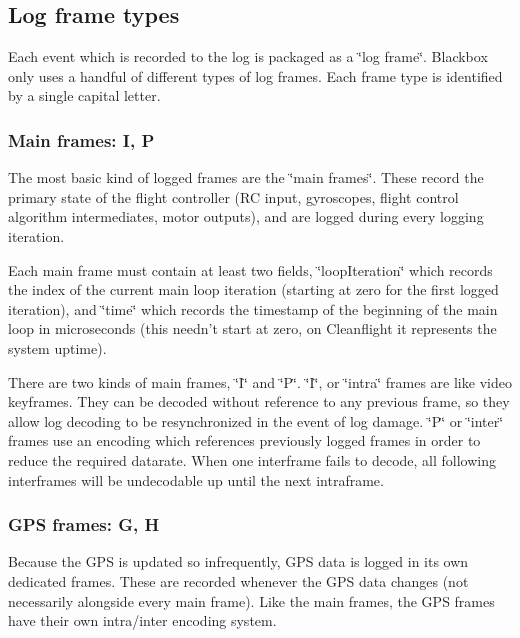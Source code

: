 \subsection*{Log frame types}

Each event which is recorded to the log is packaged as a \char`\"{}log frame\char`\"{}. Blackbox only uses a handful of different types of log frames. Each frame type is identified by a single capital letter.

\subsubsection*{Main frames\+: I, P}

The most basic kind of logged frames are the \char`\"{}main frames\char`\"{}. These record the primary state of the flight controller (R\+C input, gyroscopes, flight control algorithm intermediates, motor outputs), and are logged during every logging iteration.

Each main frame must contain at least two fields, \char`\"{}loop\+Iteration\char`\"{} which records the index of the current main loop iteration (starting at zero for the first logged iteration), and \char`\"{}time\char`\"{} which records the timestamp of the beginning of the main loop in microseconds (this needn't start at zero, on Cleanflight it represents the system uptime).

There are two kinds of main frames, \char`\"{}\+I\char`\"{} and \char`\"{}\+P\char`\"{}. \char`\"{}\+I\char`\"{}, or \char`\"{}intra\char`\"{} frames are like video keyframes. They can be decoded without reference to any previous frame, so they allow log decoding to be resynchronized in the event of log damage. \char`\"{}\+P\char`\"{} or \char`\"{}inter\char`\"{} frames use an encoding which references previously logged frames in order to reduce the required datarate. When one interframe fails to decode, all following interframes will be undecodable up until the next intraframe.

\subsubsection*{G\+P\+S frames\+: G, H}

Because the G\+P\+S is updated so infrequently, G\+P\+S data is logged in its own dedicated frames. These are recorded whenever the G\+P\+S data changes (not necessarily alongside every main frame). Like the main frames, the G\+P\+S frames have their own intra/inter encoding system.

